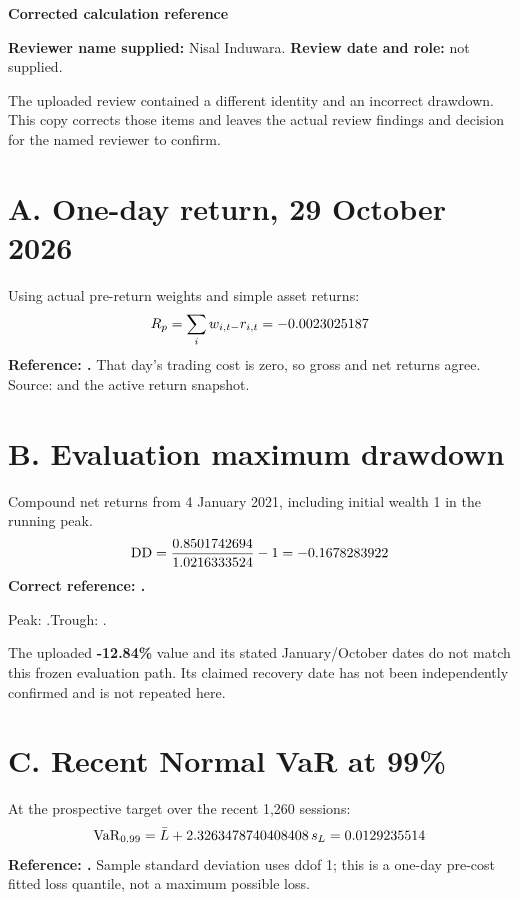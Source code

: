 \documentclass[11pt,a4paper]{article}
\begin{document}
\par
{\sffamily\bfseries\LARGE\color{qeink} Corrected calculation reference\par}

\textbf{Reviewer name supplied:} Nisal Induwara.\quad
\textbf{Review date and role:} not supplied.\par
The uploaded review contained a different identity and an incorrect drawdown. This copy corrects those items and leaves the actual review findings and decision for the named reviewer to confirm.

\section*{A. One-day return, 29 October 2026}
Using actual pre-return weights and simple asset returns:
\[
R_p=\sum_i w_{i,t-}r_{i,t}=-0.0023025187
\]
\textbf{Reference: \nrOneDayPct.} That day's trading cost is zero, so gross and net returns agree. Source:  and the active return snapshot.

\section*{B. Evaluation maximum drawdown}
Compound net returns from 4 January 2021, including initial wealth 1 in the running peak.
\[
\operatorname{DD}=\frac{0.8501742694}{1.0216333524}-1=-0.1678283922
\]
\textbf{Correct reference: \nrDrawdownPct.}\par
Peak: \nrPeakDate.\quad Trough: \nrTroughDate.\par
The uploaded \textbf{-12.84\%} value and its stated January/October dates do not match this frozen evaluation path. Its claimed recovery date has not been independently confirmed and is not repeated here.

\section*{C. Recent Normal VaR at 99\%}
At the prospective target over the recent 1,260 sessions:
\[
\operatorname{VaR}_{0.99}=\bar L+2.3263478740408408\,s_L=0.0129235514
\]
\textbf{Reference: \nrNormalVarPct.} Sample standard deviation uses ddof 1; this is a one-day pre-cost fitted loss quantile, not a maximum possible loss.
\end{document}
